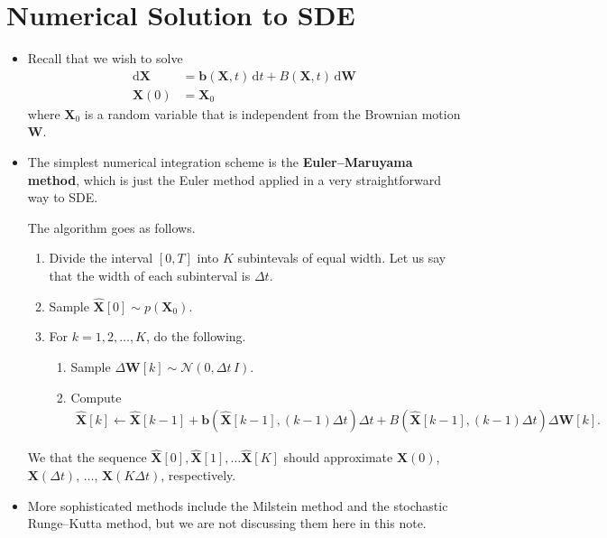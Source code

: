 \documentclass[10pt]{article}
\newcommand{\dee}{\mathrm{d}}
\newcommand{\ve}[1]{\mathbf{#1}}
\newcommand{\mcal}[1]{\mathcal{#1}}
\begin{document}
\section{Numerical Solution to SDE}
\begin{itemize}
  \item Recall that we wish to solve
  \begin{align*}
    \dee \ve{X} &= \ve{b}(\ve{X},t)\, \dee t + B(\ve{X},t)\, \dee \ve{W} \\
    \ve{X}(0) &= \ve{X}_0
  \end{align*}
  where $\ve{X}_0$ is a random variable that is independent from the Brownian motion $\ve{W}$.

  \item The simplest numerical integration scheme is the {\bf Euler--Maruyama method}, which is just the Euler method applied in a very straightforward way to SDE.
  
  The algorithm goes as follows.
  \begin{enumerate}
    \item Divide the interval $[0,T]$ into $K$ subintevals of equal width. Let us say that the width of each subinterval is $\Delta t$.
    
    \item Sample $\widehat{\ve{X}}[0] \sim p(\ve{X}_0)$.
    
    \item For $k = 1, 2, \dotsc, K$, do the following.
    \begin{enumerate}
      \item Sample $\Delta \ve{W}[k] \sim \mcal{N}(0,\Delta t\, I )$.
      
      \item Compute
      \begin{align*}
        \widehat{\ve{X}}[k]
        \gets
        \widehat{\ve{X}}[k-1] + \ve{b}(\widehat{\ve{X}}[k-1], (k-1)\Delta t) \Delta t + B(\widehat{\ve{X}}[k-1], (k-1)\Delta t) \Delta \ve{W}[k].
      \end{align*}
    \end{enumerate}
  \end{enumerate}
  We that the sequence $\widehat{\ve{X}}[0], \widehat{\ve{X}}[1], \dotsc \widehat{\ve{X}}[K]$ should approximate $\ve{X}(0)$, $\ve{X}(\Delta t)$, $\dotsc$, $\ve{X}(K \Delta t)$, respectively.
  
  \item More sophisticated methods include the Milstein method and the stochastic Runge--Kutta method, but we are not discussing them here in this note.
\end{itemize}

  
\end{document}

